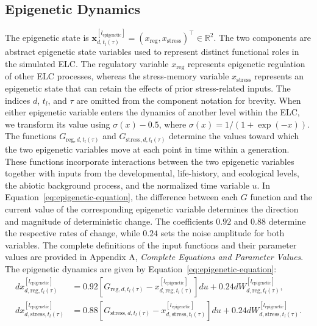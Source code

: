 \documentclass[11pt]{article}
\begin{document}
\subsection{Epigenetic Dynamics}
The epigenetic state is
$\mathbf{x}^{[l_{\mathrm{epigenetic}}]}_{d,t_l(\tau)}
=(x_{\mathrm{reg}},x_{\mathrm{stress}})^\top\in\mathbb{R}^2$.
The two components are abstract epigenetic state variables used to represent distinct functional roles in the simulated ELC. The regulatory variable $x_{\mathrm{reg}}$ represents epigenetic regulation of other ELC processes, whereas the stress-memory variable $x_{\mathrm{stress}}$ represents an epigenetic state that can retain the effects of prior stress-related inputs. The indices $d$, $t_l$, and $\tau$ are omitted from the component notation for brevity. When either epigenetic variable enters the dynamics of another level within the ELC, we transform its value using $\sigma(x)-0.5$, where $\sigma(x)=1/(1+\exp(-x))$. The functions $G_{\mathrm{reg},d,t_l(\tau)}$ and $G_{\mathrm{stress},d,t_l(\tau)}$ determine the values toward which the two epigenetic variables move at each point in time within a generation. These functions incorporate interactions between the two epigenetic variables together with inputs from the developmental, life-history, and ecological levels, the abiotic background process, and the normalized time variable $u$. In Equation~\ref{eq:epigenetic-equation}, the difference between each $G$ function and the current value of the corresponding epigenetic variable determines the direction and magnitude of deterministic change. The coefficients $0.92$ and $0.88$ determine the respective rates of change, while $0.24$ sets the noise amplitude for both variables. The complete definitions of the input functions and their parameter values are provided in Appendix A, \textit{Complete Equations and Parameter Values}. The epigenetic dynamics are given by Equation~\ref{eq:epigenetic-equation}:
\begin{equation}
\begin{aligned}
dx^{[l_{\mathrm{epigenetic}}]}_{d,\mathrm{reg},t_l(\tau)}
&=
0.92
\left[
G_{\mathrm{reg},d,t_l(\tau)}
-
x^{[l_{\mathrm{epigenetic}}]}_{d,\mathrm{reg},t_l(\tau)}
\right]du
+
0.24
dW^{[l_{\mathrm{epigenetic}}]}_{d,\mathrm{reg},t_l(\tau)},
\\
dx^{[l_{\mathrm{epigenetic}}]}_{d,\mathrm{stress},t_l(\tau)}
&=
0.88
\left[
G_{\mathrm{stress},d,t_l(\tau)}
-
x^{[l_{\mathrm{epigenetic}}]}_{d,\mathrm{stress},t_l(\tau)}
\right]du
+
0.24
dW^{[l_{\mathrm{epigenetic}}]}_{d,\mathrm{stress},t_l(\tau)} .
\end{aligned}
\label{eq:epigenetic-equation}
\end{equation}
\end{document}

